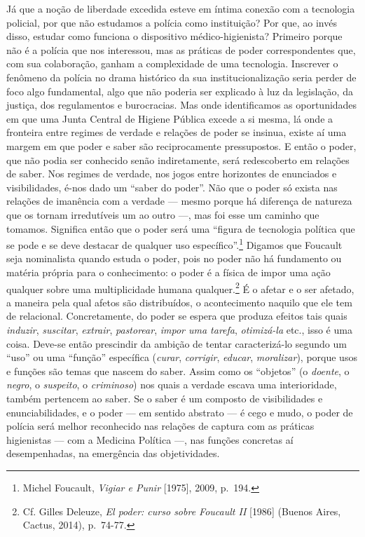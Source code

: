 Já que a noção de liberdade excedida esteve em íntima conexão com a
tecnologia policial, por que não estudamos a polícia como instituição?
Por que, ao invés disso, estudar como funciona o dispositivo
médico-higienista? Primeiro porque não é a polícia que nos interessou,
mas as práticas de poder correspondentes que, com sua colaboração,
ganham a complexidade de uma tecnologia. Inscrever o fenômeno da polícia
no drama histórico da sua institucionalização seria perder de foco algo
fundamental, algo que não poderia ser explicado à luz da legislação, da
justiça, dos regulamentos e burocracias. Mas onde identificamos as
oportunidades em que uma Junta Central de Higiene Pública excede a si
mesma, lá onde a fronteira entre regimes de verdade e relações de poder
se insinua, existe aí uma margem em que poder e saber são reciprocamente
pressupostos. E então o poder, que não podia ser conhecido senão
indiretamente, será redescoberto em relações de saber. Nos regimes de
verdade, nos jogos entre horizontes de enunciados e visibilidades, é-nos
dado um ``saber do poder''. Não que o poder só exista nas relações de
imanência com a verdade --- mesmo porque há diferença de natureza que os
tornam irredutíveis um ao outro ---, mas foi esse um caminho que tomamos.
Significa então que o poder será uma ``figura de tecnologia política que
se pode e se deve destacar de qualquer uso específico''.\footnote{Michel
  Foucault, \textit{Vigiar e Punir} {[}1975{]}, 2009, p.~194.} Digamos que
Foucault seja nominalista quando estuda o poder, pois no poder não há
fundamento ou matéria própria para o conhecimento: o poder é a física de
impor uma ação qualquer sobre uma multiplicidade humana
qualquer.\footnote{Cf. Gilles Deleuze, \textit{El poder: curso sobre
  Foucault II} {[}1986{]} (Buenos Aires, Cactus, 2014), p.~74-77.} É o
afetar e o ser afetado, a maneira pela qual afetos são distribuídos, o
acontecimento naquilo que ele tem de relacional. Concretamente, do poder
se espera que produza efeitos tais quais \textit{induzir},
\textit{suscitar}, \textit{extrair}, \textit{pastorear}, \textit{impor uma
tarefa}, \textit{otimizá-la} etc., isso é uma coisa. Deve-se então
prescindir da ambição de tentar caracterizá-lo segundo um ``uso'' ou uma
``função'' específica (\textit{curar}, \textit{corrigir}, \textit{educar},
\textit{moralizar}), porque usos e funções são temas que nascem do saber.
Assim como os ``objetos'' (o \textit{doente}, o \textit{negro}, o
\textit{suspeito}, o \textit{criminoso}) nos quais a verdade escava uma
interioridade, também pertencem ao saber. Se o saber é um composto de
visibilidades e enunciabilidades, e o poder --- em sentido abstrato --- é
cego e mudo, o poder de polícia será melhor reconhecido nas relações de
captura com as práticas higienistas --- com a Medicina Política ---, nas
funções concretas aí desempenhadas, na emergência das objetividades.

